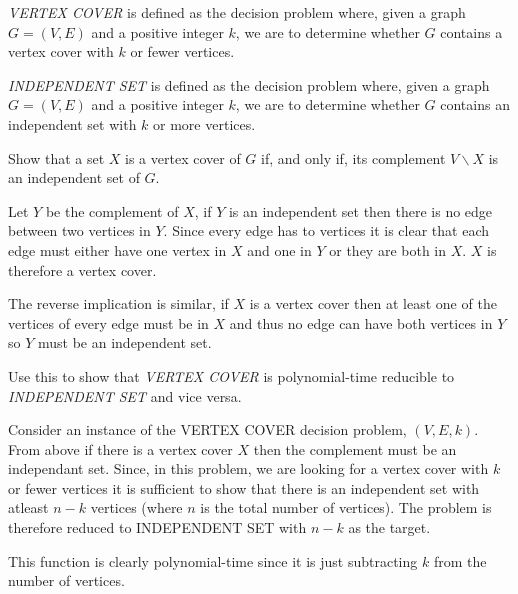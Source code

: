 \documentclass{supervision}
\begin{document}
\begin{questions}
\begin{parts}
          \emph{VERTEX COVER} is defined as the decision problem where, given a
          graph $G = (V, E)$ and a positive integer $k$, we are to determine
          whether $G$ contains a vertex cover with $k$ or fewer vertices.

          \emph{INDEPENDENT SET} is defined as the decision problem where, given
          a graph $G = (V, E)$ and a positive integer $k$, we are to determine
          whether $G$ contains an independent set with $k$ or more vertices.

          \begin{subparts}
            \subpart[2] Show that a set $X$ is a vertex cover of $G$ if, and
              only if, its complement $V \backslash X$ is an independent set of
              $G$.
              \begin{solution}
                Let $Y$ be the complement of $X$, if $Y$ is an independent set
                then there is no edge between two vertices in $Y$. Since every
                edge has to vertices it is clear that each edge must either have
                one vertex in $X$ and one in $Y$ or they are both in $X$. $X$ is
                therefore a vertex cover.

                The reverse implication is similar, if $X$ is a vertex cover
                then at least one of the vertices of every edge must be in $X$
                and thus no edge can have both vertices in $Y$ so $Y$ must be an
                independent set.
              \end{solution}

            \subpart[6] Use this to show that \emph{VERTEX COVER} is
              polynomial-time reducible to \emph{INDEPENDENT SET} and vice
              versa.
              \begin{solution}
                Consider an instance of the VERTEX COVER decision problem, $(V,
                E, k)$. From above if there is a vertex cover $X$ then the
                complement must be an independant set. Since, in this problem,
                we are looking for a vertex cover with $k$ or fewer vertices it
                is sufficient to show that there is an independent set with
                atleast $n - k$ vertices (where $n$ is the total number of
                vertices). The problem is therefore reduced to INDEPENDENT SET
                with $n - k$ as the target.

                This function is clearly polynomial-time since it is just
                subtracting $k$ from the number of vertices.


\end{solution}
\end{subparts}
\end{parts}
\end{questions}
\end{document}

